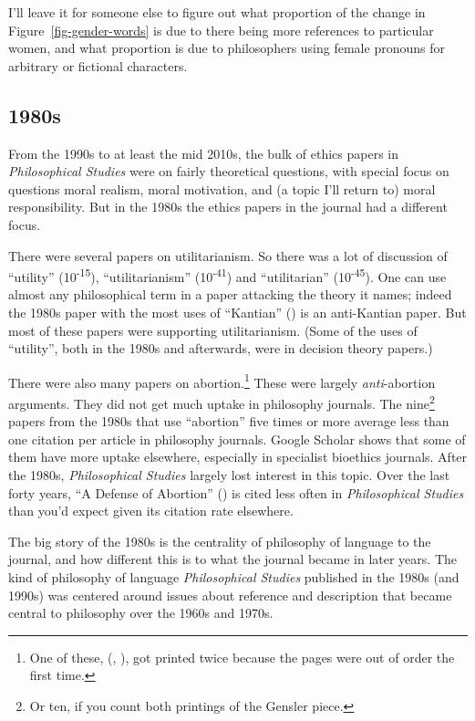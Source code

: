 \documentclass[
  11pt,
  letterpaper,
  DIV=11,
  numbers=noendperiod,
  twoside]{scrartcl}
\begin{document}
I'll leave it for someone else to figure out what proportion of the
change in Figure~\ref{fig-gender-words} is due to there being more
references to particular women, and what proportion is due to
philosophers using female pronouns for arbitrary or fictional
characters.

\subsection{1980s}\label{sec-1980s-articles}

From the 1990s to at least the mid 2010s, the bulk of ethics papers in
\emph{Philosophical Studies} were on fairly theoretical questions, with
special focus on questions moral realism, moral motivation, and (a topic
I'll return to) moral responsibility. But in the 1980s the ethics papers
in the journal had a different focus.

There were several papers on utilitarianism. So there was a lot of
discussion of ``utility'' (10\textsuperscript{-15}), ``utilitarianism''
(10\textsuperscript{-41}) and ``utilitarian'' (10\textsuperscript{-45}).
One can use almost any philosophical term in a paper attacking the
theory it names; indeed the 1980s paper with the most uses of
``Kantian'' () is an
anti-Kantian paper. But most of these papers were supporting
utilitarianism. (Some of the uses of ``utility'', both in the 1980s and
afterwards, were in decision theory papers.)

There were also many papers on abortion.\footnote{One of these,
  (,
  ), got printed twice because
  the pages were out of order the first time.} These were largely
\emph{anti}-abortion arguments. They did not get much uptake in
philosophy journals. The nine\footnote{Or ten, if you count both
  printings of the Gensler piece.} papers from the 1980s that use
``abortion'' five times or more average less than one citation per
article in philosophy journals. Google Scholar shows that some of them
have more uptake elsewhere, especially in specialist bioethics journals.
After the 1980s, \emph{Philosophical Studies} largely lost interest in
this topic. Over the last forty years, ``A Defense of Abortion''
() is cited less often in
\emph{Philosophical Studies} than you'd expect given its citation rate
elsewhere.

The big story of the 1980s is the centrality of philosophy of language
to the journal, and how different this is to what the journal became in
later years. The kind of philosophy of language \emph{Philosophical
Studies} published in the 1980s (and 1990s) was centered around issues
about reference and description that became central to philosophy over
the 1960s and 1970s.
\end{document}
